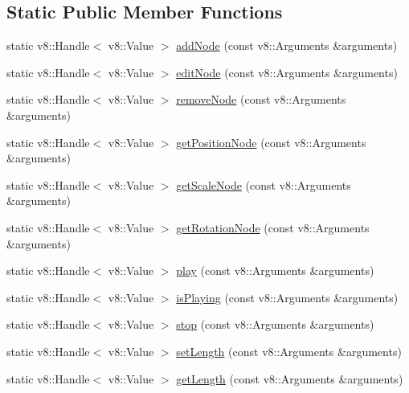 \subsection*{Static Public Member Functions}
\begin{DoxyCompactItemize}
\item 
static v8\-::\-Handle$<$ v8\-::\-Value $>$ \hyperlink{class_rad_xml_1_1_animation_track_class_af65fa8ea3aaa34913d94da56395b4282}{add\-Node} (const v8\-::\-Arguments \&arguments)
\item 
static v8\-::\-Handle$<$ v8\-::\-Value $>$ \hyperlink{class_rad_xml_1_1_animation_track_class_a1dcd1bcac962dc76af6958e58014d337}{edit\-Node} (const v8\-::\-Arguments \&arguments)
\item 
static v8\-::\-Handle$<$ v8\-::\-Value $>$ \hyperlink{class_rad_xml_1_1_animation_track_class_a3d9a85b70fc81acb8a270d15292abe45}{remove\-Node} (const v8\-::\-Arguments \&arguments)
\item 
static v8\-::\-Handle$<$ v8\-::\-Value $>$ \hyperlink{class_rad_xml_1_1_animation_track_class_aa9e8b9340083d1cbf8f3c610d66da043}{get\-Position\-Node} (const v8\-::\-Arguments \&arguments)
\item 
static v8\-::\-Handle$<$ v8\-::\-Value $>$ \hyperlink{class_rad_xml_1_1_animation_track_class_a74fb8be1aa204371ce97a3b3ae2eca52}{get\-Scale\-Node} (const v8\-::\-Arguments \&arguments)
\item 
static v8\-::\-Handle$<$ v8\-::\-Value $>$ \hyperlink{class_rad_xml_1_1_animation_track_class_ac42a889836cb8bdac9440f21afc36e58}{get\-Rotation\-Node} (const v8\-::\-Arguments \&arguments)
\item 
static v8\-::\-Handle$<$ v8\-::\-Value $>$ \hyperlink{class_rad_xml_1_1_animation_track_class_a309b7e0acb4a1b5e3171565b6f68df12}{play} (const v8\-::\-Arguments \&arguments)
\item 
static v8\-::\-Handle$<$ v8\-::\-Value $>$ \hyperlink{class_rad_xml_1_1_animation_track_class_a98ea31b8ae1dec85043de2c965c8bfc1}{is\-Playing} (const v8\-::\-Arguments \&arguments)
\item 
static v8\-::\-Handle$<$ v8\-::\-Value $>$ \hyperlink{class_rad_xml_1_1_animation_track_class_a4e729a1c4720239b80a0aa206d374e57}{stop} (const v8\-::\-Arguments \&arguments)
\item 
static v8\-::\-Handle$<$ v8\-::\-Value $>$ \hyperlink{class_rad_xml_1_1_animation_track_class_a590f5a764adbe57eac556f59f81cfc7c}{set\-Length} (const v8\-::\-Arguments \&arguments)
\item 
static v8\-::\-Handle$<$ v8\-::\-Value $>$ \hyperlink{class_rad_xml_1_1_animation_track_class_a50a7535d81846f2e575fe12720afb9aa}{get\-Length} (const v8\-::\-Arguments \&arguments)

\end{DoxyCompactItemize}
